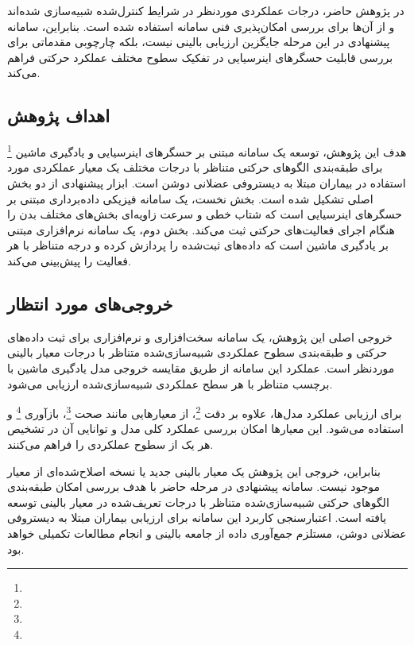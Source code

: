  در پژوهش حاضر، درجات عملکردی موردنظر در شرایط کنترل‌شده شبیه‌سازی شده‌اند و از آن‌ها برای بررسی امکان‌پذیری فنی سامانه استفاده شده است. بنابراین، سامانه پیشنهادی در این مرحله جایگزین ارزیابی بالینی نیست، بلکه چارچوبی مقدماتی برای بررسی قابلیت حسگرهای اینرسیایی در تفکیک سطوح مختلف عملکرد حرکتی فراهم می‌کند.

\subsection{اهداف پژوهش}
\label{Objective}
هدف این پژوهش، توسعه یک سامانه مبتنی بر حسگرهای اینرسیایی و یادگیری ماشین 
\footnote{}
برای طبقه‌بندی الگوهای حرکتی متناظر با درجات مختلف یک معیار عملکردی مورد استفاده در بیماران مبتلا به دیستروفی عضلانی دوشن است.
ابزار پیشنهادی از دو بخش اصلی تشکیل شده است. بخش نخست، یک سامانه فیزیکی داده‌برداری مبتنی بر حسگرهای اینرسیایی است که شتاب خطی و سرعت زاویه‌ای بخش‌های مختلف بدن را هنگام اجرای فعالیت‌های حرکتی ثبت می‌کند. بخش دوم، یک سامانه نرم‌افزاری مبتنی بر یادگیری ماشین است که داده‌های ثبت‌شده را پردازش کرده و درجه متناظر با هر فعالیت را پیش‌بینی می‌کند.




\subsection{خروجی‌های مورد انتظار}
خروجی اصلی این پژوهش، یک سامانه سخت‌افزاری و نرم‌افزاری برای ثبت داده‌های حرکتی و طبقه‌بندی سطوح عملکردی شبیه‌سازی‌شده متناظر با درجات معیار بالینی موردنظر است. عملکرد این سامانه از طریق مقایسه خروجی مدل یادگیری ماشین با برچسب متناظر با هر سطح عملکردی شبیه‌سازی‌شده ارزیابی می‌شود.

برای ارزیابی عملکرد مدل‌ها، علاوه بر دقت
\footnote{}،
از معیارهایی مانند صحت
\footnote{}،
بازآوری
\footnote{}
و
استفاده می‌شود. این معیارها امکان بررسی عملکرد کلی مدل و توانایی آن در تشخیص هر یک از سطوح عملکردی را فراهم می‌کنند.

بنابراین، خروجی این پژوهش یک معیار بالینی جدید یا نسخه اصلاح‌شده‌ای از معیار موجود نیست. سامانه پیشنهادی در مرحله حاضر با هدف بررسی امکان طبقه‌بندی الگوهای حرکتی شبیه‌سازی‌شده متناظر با درجات تعریف‌شده در معیار بالینی توسعه یافته است. اعتبارسنجی کاربرد این سامانه برای ارزیابی بیماران مبتلا به دیستروفی عضلانی دوشن، مستلزم جمع‌آوری داده از جامعه بالینی و انجام مطالعات تکمیلی خواهد بود.